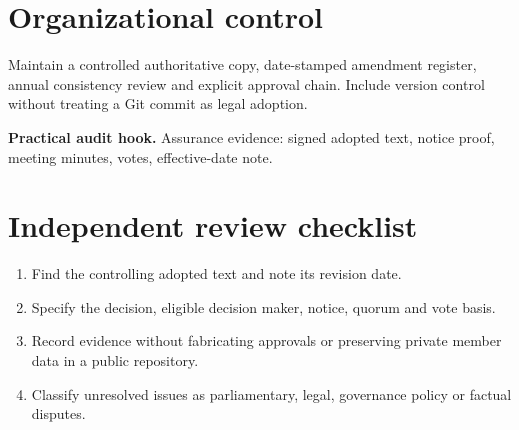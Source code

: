 \documentclass[11pt]{article}
\begin{document}
\section{Organizational control}
Maintain a controlled authoritative copy, date-stamped amendment register, annual consistency review and explicit approval chain. Include version control without treating a Git commit as legal adoption.

\textbf{Practical audit hook.} Assurance evidence: signed adopted text, notice proof, meeting minutes, votes, effective-date note.

\section{Independent review checklist}
\begin{enumerate}[leftmargin=*,itemsep=4pt]
\item Find the controlling adopted text and note its revision date.
\item Specify the decision, eligible decision maker, notice, quorum and vote basis.
\item Record evidence without fabricating approvals or preserving private member data in a public repository.
\item Classify unresolved issues as parliamentary, legal, governance policy or factual disputes.
\end{enumerate}
\end{document}
